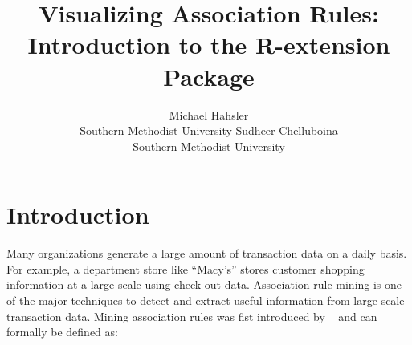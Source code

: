\documentclass[nojss]{jss}
\author{Michael Hahsler\\Southern Methodist University \And
	Sudheer Chelluboina\\Southern Methodist University}
\title{Visualizing Association Rules: Introduction to the R-extension Package \pkg{arulesViz}}
\begin{document}
\maketitle
\sloppy


\section{Introduction}

Many organizations generate a large amount of transaction data
on a daily basis.
For example, a
department store like ``Macy's'' stores customer shopping information at a
large scale using check-out data.  Association rule mining is one of the major
techniques to detect and extract useful information from large scale transaction
data. Mining association rules
was fist introduced by ~\cite{arules:Agrawal+Imielinski+Swami:1993}
and can formally be defined as:
\end{document}
